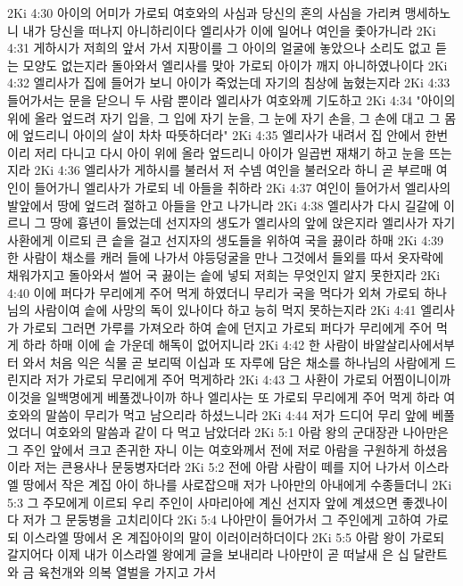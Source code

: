 2Ki 4:30  아이의 어미가 가로되 여호와의 사심과 당신의 혼의 사심을 가리켜 맹세하노니 내가 당신을 떠나지 아니하리이다 엘리사가 이에 일어나 여인을 좇아가니라
2Ki 4:31  게하시가 저희의 앞서 가서 지팡이를 그 아이의 얼굴에 놓았으나 소리도 없고 듣는 모양도 없는지라 돌아와서 엘리사를 맞아 가로되 아이가 깨지 아니하였나이다
2Ki 4:32  엘리사가 집에 들어가 보니 아이가 죽었는데 자기의 침상에 눕혔는지라
2Ki 4:33  들어가서는 문을 닫으니 두 사람 뿐이라 엘리사가 여호와께 기도하고
2Ki 4:34  "아이의 위에 올라 엎드려 자기 입을, 그 입에 자기 눈을, 그 눈에 자기 손을, 그 손에 대고 그 몸에 엎드리니 아이의 살이 차차 따뜻하더라"
2Ki 4:35  엘리사가 내려서 집 안에서 한번 이리 저리 다니고 다시 아이 위에 올라 엎드리니 아이가 일곱번 재채기 하고 눈을 뜨는지라
2Ki 4:36  엘리사가 게하시를 불러서 저 수넴 여인을 불러오라 하니 곧 부르매 여인이 들어가니 엘리사가 가로되 네 아들을 취하라
2Ki 4:37  여인이 들어가서 엘리사의 발앞에서 땅에 엎드려 절하고 아들을 안고 나가니라
2Ki 4:38  엘리사가 다시 길갈에 이르니 그 땅에 흉년이 들었는데 선지자의 생도가 엘리사의 앞에 앉은지라 엘리사가 자기 사환에게 이르되 큰 솥을 걸고 선지자의 생도들을 위하여 국을 끓이라 하매
2Ki 4:39  한 사람이 채소를 캐러 들에 나가서 야등덩굴을 만나 그것에서 들외를 따서 옷자락에 채워가지고 돌아와서 썰어 국 끓이는 솥에 넣되 저희는 무엇인지 알지 못한지라
2Ki 4:40  이에 퍼다가 무리에게 주어 먹게 하였더니 무리가 국을 먹다가 외쳐 가로되 하나님의 사람이여 솥에 사망의 독이 있나이다 하고 능히 먹지 못하는지라
2Ki 4:41  엘리사가 가로되 그러면 가루를 가져오라 하여 솥에 던지고 가로되 퍼다가 무리에게 주어 먹게 하라 하매 이에 솥 가운데 해독이 없어지니라
2Ki 4:42  한 사람이 바알살리사에서부터 와서 처음 익은 식물 곧 보리떡 이십과 또 자루에 담은 채소를 하나님의 사람에게 드린지라 저가 가로되 무리에게 주어 먹게하라
2Ki 4:43  그 사환이 가로되 어찜이니이까 이것을 일백명에게 베풀겠나이까 하나 엘리사는 또 가로되 무리에게 주어 먹게 하라 여호와의 말씀이 무리가 먹고 남으리라 하셨느니라
2Ki 4:44  저가 드디어 무리 앞에 베풀었더니 여호와의 말씀과 같이 다 먹고 남았더라
2Ki 5:1  아람 왕의 군대장관 나아만은 그 주인 앞에서 크고 존귀한 자니 이는 여호와께서 전에 저로 아람을 구원하게 하셨음이라 저는 큰용사나 문둥병자더라
2Ki 5:2  전에 아람 사람이 떼를 지어 나가서 이스라엘 땅에서 작은 계집 아이 하나를 사로잡으매 저가 나아만의 아내에게 수종들더니
2Ki 5:3  그 주모에게 이르되 우리 주인이 사마리아에 계신 선지자 앞에 계셨으면 좋겠나이다 저가 그 문둥병을 고치리이다
2Ki 5:4  나아만이 들어가서 그 주인에게 고하여 가로되 이스라엘 땅에서 온 계집아이의 말이 이러이러하더이다
2Ki 5:5  아람 왕이 가로되 갈지어다 이제 내가 이스라엘 왕에게 글을 보내리라 나아만이 곧 떠날새 은 십 달란트와 금 육천개와 의복 열벌을 가지고 가서
